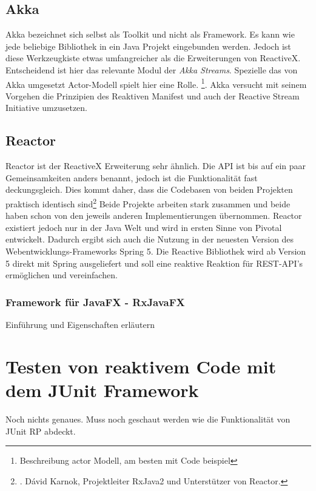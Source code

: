 \subsection{Akka}
Akka bezeichnet sich selbst als Toolkit und nicht als Framework. Es kann wie jede beliebige Bibliothek in ein Java Projekt eingebunden werden. Jedoch ist diese Werkzeugkiste etwas umfangreicher als die Erweiterungen von ReactiveX. Entscheidend ist hier das relevante Modul der \textit{Akka Streams}. Spezielle das von Akka umgesetzt Actor-Modell spielt hier eine Rolle. \footnote{Beschreibung actor Modell, am besten mit Code beispiel}. Akka versucht mit seinem Vorgehen die Prinzipien des Reaktiven Manifest und auch der Reactive Stream Initiative umzusetzen.
\subsection{Reactor}
Reactor ist der ReactiveX Erweiterung sehr ähnlich. Die API ist bis auf ein paar Gemeinsamkeiten anders benannt, jedoch ist die Funktionalität fast deckungsgleich. Dies kommt daher, dass die Codebasen von beiden Projekten praktisch identisch sind\footnote{\cite{Karnok.2016}. Dávid Karnok, Projektleiter RxJava2 und Unterstützer von Reactor.} Beide Projekte arbeiten stark zusammen und beide haben schon von den jeweils anderen Implementierungen übernommen. Reactor existiert jedoch nur in der Java Welt und wird in ersten Sinne von Pivotal entwickelt. Dadurch ergibt sich auch die Nutzung in der neuesten Version des Webentwicklungs-Frameworks Spring 5. Die Reactive Bibliothek wird ab Version 5 direkt mit Spring ausgeliefert und soll eine reaktive Reaktion für REST-API's ermöglichen und vereinfachen. 
\subsubsection{Framework für JavaFX - RxJavaFX}
Einführung und Eigenschaften erläutern
\section{Testen von reaktivem Code mit dem JUnit Framework}
Noch nichts genaues. Muss noch geschaut werden wie die Funktionalität von JUnit RP abdeckt.